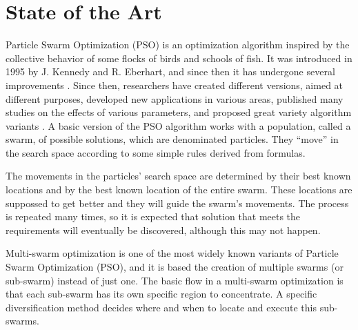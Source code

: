 \documentclass[runningheads]{llncs}
\begin{document}
\section{State of the Art}
\label{sec:soa}

Particle Swarm Optimization (PSO) is an optimization algorithm
inspired by the collective behavior of some flocks of birds and schools of fish. It was introduced in 1995 by  J. Kennedy and
R. Eberhart, and since then it has undergone several improvements \cite{b1}. %
Since then, researchers have created different versions, aimed at different
purposes, developed new applications in various areas, published many
studies on the effects of various parameters, and proposed great
variety algorithm variants \cite{b2}. %
A basic version of the PSO algorithm
works with a population, called a swarm, of possible solutions, which
are denominated particles. They ``move'' in the search space according to
some simple rules derived from formulas. %

The movements in the particles' search space are
determined by their best known locations and by the best known location
of the entire swarm. %
These locations are suppossed to get better and they will
guide the swarm's movements. The process is repeated many times, so it
is expected that solution that meets the requirements will eventually be
discovered, although this may not happen\cite{b3}. %


Multi-swarm optimization is one of the most widely known variants of Particle Swarm Optimization
(PSO), and it is based the creation of multiple swarms (or sub-swarm)
instead of just one. %
The basic flow in
a multi-swarm optimization is that each sub-swarm has its own specific region to concentrate. A specific diversification method decides where and
when to locate and execute this sub-swarms. %
\end{document}
